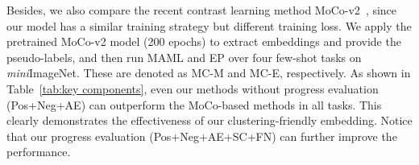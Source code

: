 \documentclass[runningheads]{llncs}
\begin{document}
Besides, we also compare the recent contrast learning method MoCo-v2~\cite{chen2020improved}, since our model has a similar training strategy but different training loss. We apply the pretrained MoCo-v2 model (200 epochs) to extract embeddings and provide the pseudo-labels, and then run MAML and EP over four few-shot tasks on \textit{mini}ImageNet. These are denoted as MC-M and MC-E, respectively.
As shown in Table~\ref{tab:key components}, even our methods without progress evaluation (Pos+Neg+AE) can outperform the MoCo-based methods in all tasks. This clearly demonstrates the effectiveness of our clustering-friendly embedding. Notice that our progress evaluation (Pos+Neg+AE+SC+FN) can further improve the performance.
\end{document}
